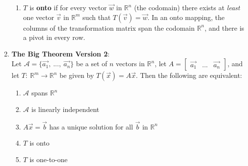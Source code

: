 \documentclass[10pt]{article}
\begin{document}
\begin{enumerate}
\begin{enumerate}
\item $T$ is \textbf{onto} if for every vector $\vec{w}$ in $\mathbb{R}^n$ (the codomain) there exists at \textit{least} one vector $\vec{v}$ in $\mathbb{R}^m$ such that $T(\vec{v}) = \vec{w}$. In an onto mapping, the columns of the transformation matrix span the codomain $\mathbb{R}^n$, and there is a pivot in every row.
\end{enumerate}
\item \textbf{The Big Theorem Version 2}: \\
Let $\mathcal{A} = \lbrace \vec{a_1},\ ...,\ \vec{a_n} \rbrace$ be a set of $n$ vectors in $\mathbb{R}^n$, let $A = \begin{bmatrix}
\vec{a_1} & ... & \vec{a_n}
\end{bmatrix}$, and let $T:\ \mathbb{R}^m \rightarrow \mathbb{R}^n$ be given by $T(\vec{x}) = A\vec{x}$. Then the following are equivalent:
\begin{enumerate}
\item $\mathcal{A}$ spans $\mathbb{R}^n$
\item $\mathcal{A}$ is linearly independent
\item $A\vec{x} = \vec{b}$ has a unique solution for all $\vec{b}$ in $\mathbb{R}^n$
\item $T$ is onto
\item $T$ is one-to-one
\end{enumerate}
\end{enumerate}
\end{document}
